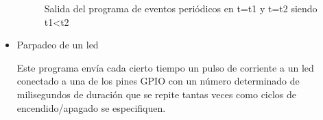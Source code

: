 \begin{itemize}
    \begin{figure}[htbp]
    \centering
    \caption{Salida del programa de eventos periódicos en t=t1 y t=t2 siendo t1<t2}
    \end{figure}

\clearpage
    \item Parpadeo de un led
    
    Este programa envía cada cierto tiempo un pulso de corriente a un led conectado a una de los pines GPIO con un número determinado de milisegundos de duración que se repite tantas veces como ciclos de encendido/apagado se especifiquen.
    
\end{itemize}
